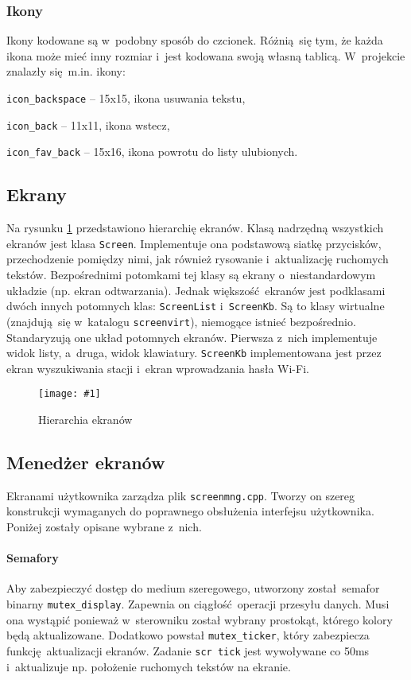 \documentclass[polish]{aghengthesis}
\let\tempone\itemize
\let\temptwo\enditemize
\renewenvironment{itemize}{\tempone\setlength{\itemsep}{0cm}}{\temptwo}
\newcommand{\imgint}[4]{
	\begin{figure}[{#4}]
		\centering
		\texttt{[image: \#1]}
		\caption{#2}
		\label{#1}
	\end{figure}
}
\newcommand{\imgh}[3]{\imgint{#1}{#2}{#3}{H}}
\begin{document}
			\subsubsection{Ikony}
				Ikony kodowane są w~podobny sposób do czcionek. Różnią się tym, że każda ikona może mieć inny rozmiar i~jest kodowana swoją własną tablicą. W~projekcie znalazły się m.in. ikony:
				\begin{itemize}
					\item \lstinline|icon_backspace| -- 15x15, ikona usuwania tekstu,
					\item \lstinline|icon_back| -- 11x11, ikona wstecz,
					\item \lstinline|icon_fav_back| -- 15x16, ikona powrotu do listy ulubionych.
				\end{itemize}
		
		\subsection{Ekrany}
			Na rysunku \ref{3/PicoRadio-screens} przedstawiono hierarchię ekranów. Klasą nadrzędną wszystkich ekranów jest klasa \lstinline|Screen|. Implementuje ona podstawową siatkę przycisków, przechodzenie pomiędzy nimi, jak również rysowanie i~aktualizację ruchomych tekstów. Bezpośrednimi potomkami tej klasy są ekrany o~niestandardowym układzie (np. ekran odtwarzania). Jednak większość ekranów jest podklasami dwóch innych potomnych klas: \lstinline|ScreenList| i~\lstinline|ScreenKb|. Są to klasy wirtualne (znajdują się w~katalogu \lstinline|screenvirt|), niemogące istnieć bezpośrednio. Standaryzują one układ potomnych ekranów. Pierwsza z~nich implementuje widok listy, a~druga, widok klawiatury. \lstinline|ScreenKb| implementowana jest przez ekran wyszukiwania stacji i~ekran wprowadzania hasła Wi-Fi.
			
			\imgh{3/PicoRadio-screens}{Hierarchia ekranów}{0.55} %
			
		\subsection{Menedżer ekranów}
			Ekranami użytkownika zarządza plik \lstinline|screenmng.cpp|. Tworzy on szereg konstrukcji wymaganych do poprawnego obsłużenia interfejsu użytkownika. Poniżej zostały opisane wybrane z~nich.
			
			\paragraph{Semafory}
				Aby zabezpieczyć dostęp do medium szeregowego, utworzony został semafor binarny \lstinline|mutex_display|. Zapewnia on ciągłość operacji przesyłu danych. Musi ona wystąpić ponieważ w~sterowniku został wybrany prostokąt, którego kolory będą aktualizowane. Dodatkowo powstał \lstinline|mutex_ticker|, który zabezpiecza funkcję aktualizacji ekranów. Zadanie \lstinline|scr tick| jest wywoływane co 50ms i~aktualizuje np. położenie ruchomych tekstów na ekranie.
				
\end{document}
